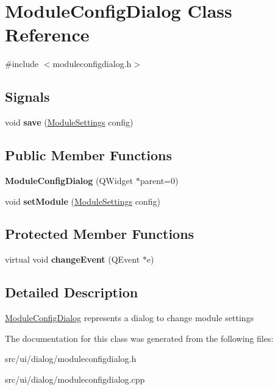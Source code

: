 \hypertarget{classModuleConfigDialog}{
\section{ModuleConfigDialog Class Reference}
\label{classModuleConfigDialog}
}


{\ttfamily \#include $<$moduleconfigdialog.h$>$}

\subsection*{Signals}
\begin{DoxyCompactItemize}
\item 
\hypertarget{classModuleConfigDialog_a84f3addff3fdb1f9ceac5efad6a21c37}{
void {\bfseries save} (\hyperlink{classModuleSettings}{ModuleSettings} config)}
\label{classModuleConfigDialog_a84f3addff3fdb1f9ceac5efad6a21c37}

\end{DoxyCompactItemize}
\subsection*{Public Member Functions}
\begin{DoxyCompactItemize}
\item 
\hypertarget{classModuleConfigDialog_aeb291f87e7e3749701299118e521ddc0}{
{\bfseries ModuleConfigDialog} (QWidget $\ast$parent=0)}
\label{classModuleConfigDialog_aeb291f87e7e3749701299118e521ddc0}

\item 
\hypertarget{classModuleConfigDialog_aa66110dc25bdd33d6b5960b87e15beb1}{
void {\bfseries setModule} (\hyperlink{classModuleSettings}{ModuleSettings} config)}
\label{classModuleConfigDialog_aa66110dc25bdd33d6b5960b87e15beb1}

\end{DoxyCompactItemize}
\subsection*{Protected Member Functions}
\begin{DoxyCompactItemize}
\item 
\hypertarget{classModuleConfigDialog_a0eeda84ed46ffc60b77183542eb4f583}{
virtual void {\bfseries changeEvent} (QEvent $\ast$e)}
\label{classModuleConfigDialog_a0eeda84ed46ffc60b77183542eb4f583}

\end{DoxyCompactItemize}


\subsection{Detailed Description}
\hyperlink{classModuleConfigDialog}{ModuleConfigDialog} represents a dialog to change module settings 

The documentation for this class was generated from the following files:\begin{DoxyCompactItemize}
\item 
src/ui/dialog/moduleconfigdialog.h\item 
src/ui/dialog/moduleconfigdialog.cpp\end{DoxyCompactItemize}
